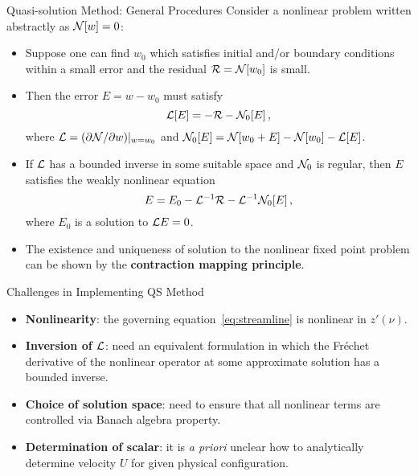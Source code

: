
\begin{block}{Quasi-solution Method: General Procedures}
  Consider a nonlinear problem written abstractly as $\mathcal{N}[w] =
  0$:
  \begin{itemize}
  \item Suppose one can find $w_{0}$ which satisfies initial and/or
    boundary conditions within a small error and the residual
    $\mathcal{R} = \mathcal{N}[w_{0}]$ is small.
  \item Then the error $E = w - w_0$ must satisfy
    \begin{equation}
      \label{eq:linear}
      \mathcal{L}[E] = -\mathcal{R} - \mathcal{N}_{0}[E] \,,
    \end{equation}
    where $\mathcal{L} = (\partial\mathcal{N}/\partial w)|_{w=w_{0}}$ and
    $\mathcal{N}_{0}[E] = \mathcal{N}[w_{0}+E] - \mathcal{N}[w_{0}] - \mathcal{L}[E]$.
  \item If $\mathcal{L}$ has a bounded inverse in some suitable space and
    $\mathcal{N}_0$ is regular, then $E$ satisfies the weakly nonlinear
    equation
    \begin{equation}
      E = E_0
      - \mathcal{L}^{-1} \mathcal{R} - \mathcal{L}^{-1} \mathcal{N}_0 [E] \,,
    \end{equation}
    where $E_0$ is a solution to
    $\mathcal{L} E = 0$.
  \item The existence and uniqueness of solution to the nonlinear
    fixed point problem can be shown by the \textbf{contraction
      mapping principle}.
  \end{itemize}
\end{block}

\begin{block}{Challenges in Implementing QS Method}
  \begin{itemize}
  \item {\bf Nonlinearity}: the governing
    equation~\eqref{eq:streamline} is nonlinear in
    $z' (\nu)$.
  \item {\bf Inversion of $\mathcal{L}$}: need an equivalent formulation in
    which the Fr\'{e}chet derivative of the nonlinear operator at some
    approximate solution has a bounded inverse.
  \item {\bf Choice of solution space}: need to ensure that all
    nonlinear terms are controlled via Banach algebra property.
  \item {\bf Determination of scalar}: it is {\it a priori\/} unclear
    how to analytically determine velocity $U$ for given physical
    configuration.
  \end{itemize}
\end{block}
